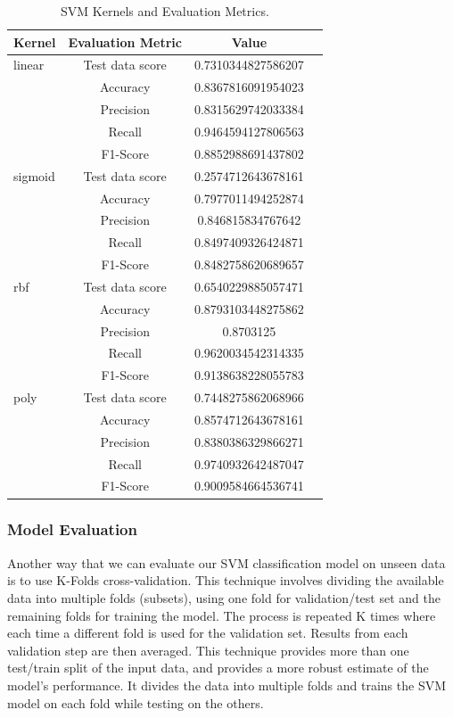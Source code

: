 \documentclass[11pt]{article}
\begin{document}
\begin{table}[hbt!]
   \large
   \centering
   \begin{tabular}{lccr}
   \hline
   \textbf{Kernel} & \textbf{Evaluation Metric} & \textbf{Value} \\ 
   \hline
   linear & Test data score & 0.7310344827586207  \\
          & Accuracy & 0.8367816091954023  \\
          & Precision & 0.8315629742033384 \\
          & Recall & 0.9464594127806563  \\
          & F1-Score & 0.8852988691437802  \\
   \hline
   sigmoid & Test data score & 0.2574712643678161  \\
          & Accuracy & 0.7977011494252874  \\
          & Precision & 0.846815834767642 \\
          & Recall & 0.8497409326424871  \\
          & F1-Score & 0.8482758620689657  \\
   \hline   
   rbf & Test data score & 0.6540229885057471  \\
          & Accuracy & 0.8793103448275862  \\
          & Precision & 0.8703125 \\
          & Recall & 0.9620034542314335  \\
          & F1-Score & 0.9138638228055783  \\
   \hline   
   poly & Test data score & 0.7448275862068966  \\
          & Accuracy & 0.8574712643678161  \\
          & Precision & 0.8380386329866271 \\
          & Recall & 0.9740932642487047  \\
          & F1-Score & 0.9009584664536741  \\
   \hline
   \end{tabular}
   \caption{SVM Kernels and Evaluation Metrics.} 
\end{table}

\subsubsection{Model Evaluation}
Another way that we can evaluate our SVM classification model on unseen data is to use K-Folds cross-validation. This technique involves dividing the available data into multiple folds (subsets), using one fold for validation/test set and the remaining folds for training the model. The process is repeated K times where each time a different fold is used for the validation set. Results from each validation step are then averaged. This technique provides more than one test/train split of the input data, and provides a more robust estimate of the model’s performance. It divides the data into multiple folds and trains the SVM model on each fold while testing on the others. \cite{geekforgeeks2023}
\end{document}
